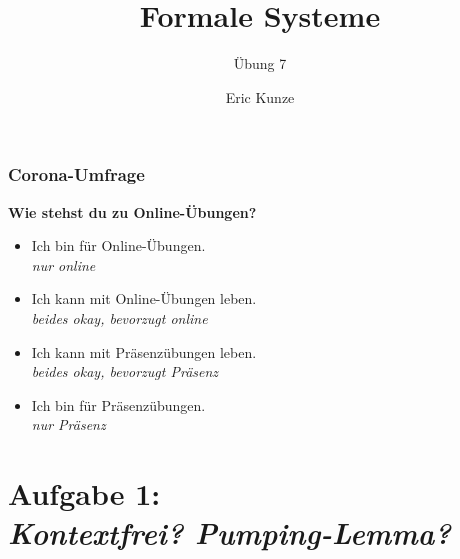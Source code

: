 \documentclass{beamer}
\begin{document}
	
	\title{Formale Systeme}
	\subtitle{Übung 7}
	\author{Eric Kunze}
	\date{}

	\maketitle

	\begin{frame} \frametitle{Corona-Umfrage}
		\textbf{Wie stehst du zu Online-Übungen?}
		\begin{itemize}
			\item Ich bin für Online-Übungen. \\
			\textit{nur online}
			\item Ich kann mit Online-Übungen leben. \\ 
			\textit{beides okay, bevorzugt online}
			\item Ich kann mit Präsenzübungen leben. \\
			\textit{beides okay, bevorzugt Präsenz}
			\item Ich bin für Präsenzübungen. \\
			\textit{nur Präsenz}
		\end{itemize}
	
		\begin{center}
			\Large
		\end{center}
	\end{frame}

	\section{Aufgabe 1: \\ \itshape Kontextfrei? Pumping-Lemma?}

	\newcommand{\colstackrel}[3]{\,{\stackrel{\textcolor{#3}{#1}}{\textcolor{#3}{#2}}}\,}
	\newcommand{\gstackrel}[2]{\colstackrel{#1}{#2}{darkgreen}}
	\newcommand{\bstackrel}[2]{\colstackrel{#1}{#2}{darkblue}}
	\newcommand{\rstackrel}[2]{\colstackrel{#1}{#2}{darkred}}
	
\end{document}
